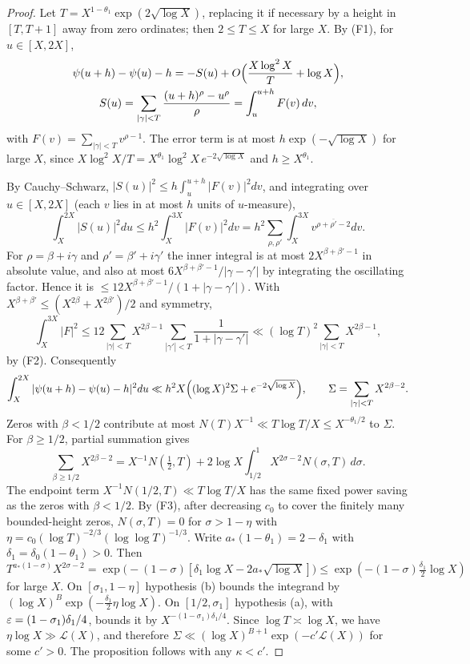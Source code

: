 \begin{proof}
Let $T=X^{1-\theta_1}\exp(2\sqrt{\log X})$, replacing it if necessary by a height in $[T,T+1]$ away from zero ordinates; then $2\le T\le X$ for large $X$. By (F1), for $u\in[X,2X]$,
\begin{gather*}
 \psi(u+h)-\psi(u)-h=-S(u)+O\Bigl(\frac{X\log^2X}{T}+\log X\Bigr),\\
 S(u)=\sum_{|\gamma|<T}\frac{(u+h)^\rho-u^\rho}{\rho}=\int_u^{u+h}F(v)\,dv,
\end{gather*}
with $F(v)=\sum_{|\gamma|<T}v^{\rho-1}$. The error term is at most $h\exp(-\sqrt{\log X})$ for large $X$, since
$X\log^2X/T=X^{\theta_1}\log^2X\,e^{-2\sqrt{\log X}}$ and $h\ge X^{\theta_1}$.

By Cauchy--Schwarz, $|S(u)|^2\le h\int_u^{u+h}|F(v)|^2dv$, and integrating over $u\in[X,2X]$ (each $v$ lies
in at most $h$ units of $u$-measure),
\[
 \int_X^{2X}|S(u)|^2du\le h^2\int_X^{3X}|F(v)|^2dv=h^2\sum_{\rho,\rho'}\int_X^{3X}v^{\rho+\overline{\rho'}-2}dv .
\]
For $\rho=\beta+i\gamma$ and $\rho'=\beta'+i\gamma'$ the inner integral is at most $2X^{\beta+\beta'-1}$ in
absolute value, and also at most $6X^{\beta+\beta'-1}/|\gamma-\gamma'|$ by integrating the oscillating factor.
Hence it is $\le12X^{\beta+\beta'-1}/(1+|\gamma-\gamma'|)$. With $X^{\beta+\beta'}\le(X^{2\beta}+X^{2\beta'})/2$
and symmetry,
\[
 \int_X^{3X}|F|^2\le 12\sum_{|\gamma|<T}X^{2\beta-1}\sum_{|\gamma'|<T}\frac1{1+|\gamma-\gamma'|}
 \ll(\log T)^2\sum_{|\gamma|<T}X^{2\beta-1},
\]
by (F2). Consequently
\[
 \int_X^{2X}|\psi(u+h)-\psi(u)-h|^2du\ll h^2X\Bigl((\log X)^2\Sigma+e^{-2\sqrt{\log X}}\Bigr),
 \qquad \Sigma=\sum_{|\gamma|<T}X^{2\beta-2}.
\]
Zeros with $\beta<1/2$ contribute at most $N(T)X^{-1}\ll T\log T/X\le X^{-\theta_1/2}$ to $\Sigma$.
For $\beta\ge1/2$, partial summation gives
\[
 \sum_{\beta\ge1/2}X^{2\beta-2}=X^{-1}N(\tfrac12,T)+2\log X\int_{1/2}^1X^{2\sigma-2}N(\sigma,T)\,d\sigma .
\]
The endpoint term $X^{-1}N(1/2,T)\ll T\log T/X$ has the same fixed power saving as the zeros with $\beta<1/2$.
By (F3), after decreasing $c_0$ to cover the finitely many bounded-height zeros, $N(\sigma,T)=0$ for $\sigma>1-\eta$ with $\eta=c_0(\log T)^{-2/3}(\log\log T)^{-1/3}$.
Write $a_*(1-\theta_1)=2-\delta_1$ with $\delta_1=\delta_0(1-\theta_1)>0$. Then
$T^{a_*(1-\sigma)}X^{2\sigma-2}=\exp\bigl(-(1-\sigma)[\delta_1\log X-2a_*\sqrt{\log X}]\bigr)
\le\exp(-(1-\sigma)\tfrac{\delta_1}{2}\log X)$ for large $X$.
On $[\sigma_1,1-\eta]$ hypothesis (b) bounds the integrand by $(\log X)^B\exp(-\tfrac{\delta_1}{2}\eta\log X)$.
On $[1/2,\sigma_1]$ hypothesis (a), with $\varepsilon=(1-\sigma_1)\delta_1/4$, bounds it by $X^{-(1-\sigma_1)\delta_1/4}$.
Since $\log T\asymp\log X$, we have $\eta\log X\gg\mathcal L(X)$, and therefore
$\Sigma\ll(\log X)^{B+1}\exp(-c'\mathcal L(X))$ for some $c'>0$. The proposition follows with any
$\kappa<c'$.
\end{proof}


